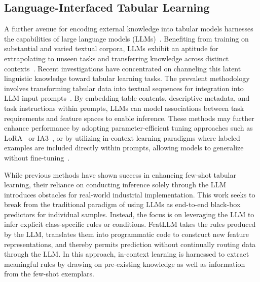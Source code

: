 \subsection{Language-Interfaced Tabular Learning} A further avenue for encoding external knowledge into tabular models harnesses the capabilities of large language models (LLMs)~\cite{anil2023palm,openai2023gpt4}. Benefiting from training on substantial and varied textual corpora, LLMs exhibit an aptitude for extrapolating to unseen tasks and transferring knowledge across distinct contexts~\cite{brown2020language}. Recent investigations have concentrated on channeling this latent linguistic knowledge toward tabular learning tasks. The prevalent methodology involves transforming tabular data into textual sequences for integration into LLM input prompts~\cite{dinh2022lift,hegselmann2023tabllm,wang2023anypredict}. By embedding table contents, descriptive metadata, and task instructions within prompts, LLMs can model associations between task requirements and feature spaces to enable inference. These methods may further enhance performance by adopting parameter-efficient tuning approaches such as LoRA~\cite{hu2021lora} or IA3~\cite{liu2022few}, or by utilizing in-context learning paradigms where labeled examples are included directly within prompts, allowing models to generalize without fine-tuning~\cite{dinh2022lift,hegselmann2023tabllm,nam2023semi,slack2023tablet}.

While previous methods have shown success in enhancing few-shot tabular learning, their reliance on conducting inference solely through the LLM introduces obstacles for real-world industrial implementation. This work seeks to break from the traditional paradigm of using LLMs as end-to-end black-box predictors for individual samples. Instead, the focus is on leveraging the LLM to infer explicit class-specific rules or conditions. \textsf{FeatLLM} takes the rules produced by the LLM, translates them into programmatic code to construct new feature representations, and thereby permits prediction without continually routing data through the LLM. In this approach, in-context learning is harnessed to extract meaningful rules by drawing on pre-existing knowledge as well as information from the few-shot exemplars.

